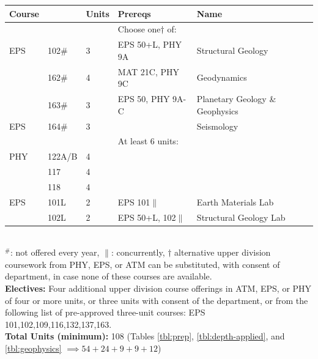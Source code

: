 \documentclass[12pt]{article}
\begin{document}
\begin{tabular}{|lllll|}
\hline
Course & & Units & Prereqs & Name \\
\hline
    & & & Choose one$\dagger$ of: &  \\

EPS & 102\# & 3 & EPS 50+L, PHY 9A & Structural Geology \\
          & 162\#         & 4 & MAT 21C, PHY 9C & Geodynamics \\
          & 163\#         & 3 & EPS 50, PHY 9A-C    & Planetary Geology \& Geophysics \\
EPS       & 164\#         & 3 &               & Seismology \\
\hline
\hline
    & & & At least 6 units: &  \\
PHY       & 122A/B & 4 & & \\
          & 117    & 4 & & \\
          & 118    & 4 & & \\
EPS       & 101L   & 2 & EPS 101$\parallel$ & Earth Materials Lab\\
          & 102L   & 2 & EPS 50+L, 102$\parallel$ & Structural Geology Lab\\
\hline
\end{tabular}\\
\noindent
$^\#$: not offered every year, $\parallel$: concurrently, $\dagger$
alternative upper division coursework from PHY, EPS, or ATM can be
substituted, with consent of department, in case none of these courses
are available.\\[4pt]
\noindent
{\bf Electives:} Four additional upper division course offerings in ATM, EPS, or PHY of four or more units, or three units with consent of the department, or from the following list of pre-approved three-unit courses:  EPS 101,102,109,116,132,137,163.\\[4pt]
\noindent
{\bf Total Units (minimum):} 108
(Tables \ref{tbl:prep}, \ref{tbl:depth-applied}, and \ref{tbl:geophysics} $\implies 54+24+9+9+12$)\\


\end{document}
